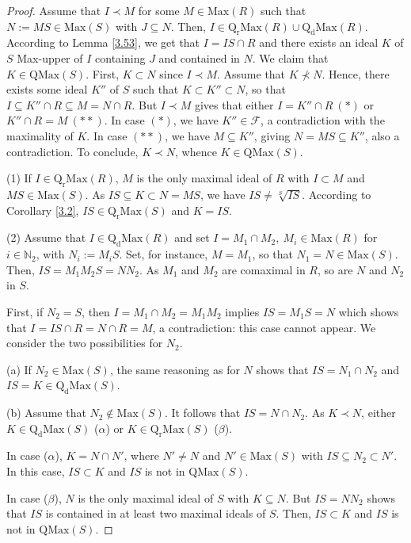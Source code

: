 \documentclass[12pt,leqno]{amsart}
\theoremstyle{definition}
\begin{document}
\begin{proof}   
Assume that $I\prec M$ for some $M\in\mathrm{Max}(R)$ such that $N:=M S\in\mathrm{Max}(S)$ with $J\subseteq N$. Then, $I\in\mathrm{Q_rMax}(R)\cup\mathrm{Q_dMax}(R)$. According to Lemma \ref{3.53}, we get that $I=IS\cap R$ and there exists an ideal $K$ of $S$ Max-upper of $I$ containing $J$ and contained in $N$. We claim that $K\in\mathrm{QMax}(S)$. First, $K\subset N$ since $I\prec M$. Assume that $K\nprec N$. Hence, there exists some ideal $K''$ of $S$ such that $K\subset K''\subset N$, so that $I\subseteq K''\cap R\subseteq M=N\cap R$. But $I\prec M$ gives that either $I=K''\cap R\ (*)$ or $K''\cap R=M\ (**)$. In case $(*)$, we have $K''\in\mathcal F$, a contradiction with the maximality of $K$. In case $(**)$, we have $M\subseteq K''$, giving $N=MS\subseteq K''$, also a contradiction. To conclude, $K\prec N$, whence $K\in\mathrm{QMax}(S)$.

(1) If $I\in\mathrm{Q_rMax}(R)$, $M$ is the only maximal ideal of $R$ with $I\subset M$ and $MS\in\mathrm{Max}(S)$. As $IS\subseteq K\subset N= MS$, we have $IS\neq\sqrt[S]{IS}$. According to Corollary \ref{3.2}, 
 $IS\in\mathrm{Q_rMax}(S)$ and $K=IS$. 

(2) Assume that $I\in\mathrm{Q_dMax}(R)$ and set $I=M_1\cap M_2,\ M_i\in\mathrm{Max}(R)$ for $i\in\mathbb N_2$, with $N_i:=M_iS$. Set, for instance, $M=M_1$, so that $N_1=N\in\mathrm{Max}(S)$. Then, $IS=M_1 M_2S=NN_2$. As $M_1$ and $M_2$ are comaximal in $R$, so are $N$ and $N_2$ in $S$. 

First, if $N_2=S$, then $I=M_1\cap M_2=M_1M_2$ implies $IS =M_1S=N$ which shows that $I=IS\cap R=N\cap R=M$, a contradiction: this case cannot appear. We  consider the two possibilities for $N_2$.

(a) If $N_2\in\mathrm{Max}(S)$, the same reasoning as for $N$ shows that $IS=N_1\cap N_2$ and $IS=K\in\mathrm {Q_dMax}(S)$. 

(b) Assume that $N_2\not\in\mathrm{Max}(S)$. It follows that $IS= N\cap N_2$. As $K\prec N$, either $K\in\mathrm{Q_dMax}(S)$ ($\alpha$) or $K\in\mathrm {Q_rMax}(S)$ ($\beta$). 

In case ($\alpha$), $K=N\cap N'$, where $N'\neq N$ and $N'\in\mathrm {Max}(S)$ with $IS\subseteq N_2\subset N'$. In this case, $IS\subset K$ and $IS$ is not in $\mathrm{QMax}(S)$.

In case ($\beta$), $N$ is the only maximal ideal of $S$ with $K\subseteq N$. But $IS=NN_2$ shows that $IS$ is contained in at least two maximal ideals of $S$. Then, $IS\subset K$ and $IS$ is not in $\mathrm{QMax}(S)$. 
\end{proof}
\end{document}
